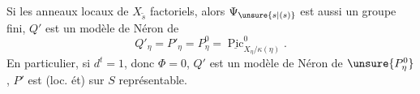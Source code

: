 Si  les anneaux locaux de $X_{\widetilde s}$ factoriels, alors $\Psi_{\unsure{s|(s)}}$ est aussi un groupe fini,
$Q'$ est un modèle de Néron de
\[
Q'_\eta=P'_\eta=P^0_\eta=\underline{\operatorname{Pic}}^0_{X_\eta/\kappa(\eta)}.
\]
En particulier, si $d^t=1$, donc $\Phi=0$, $Q'$ est un modèle de Néron de $\unsure{P^0_\eta}$,  $P'$ est (loc. ét) sur $S$ représentable.
